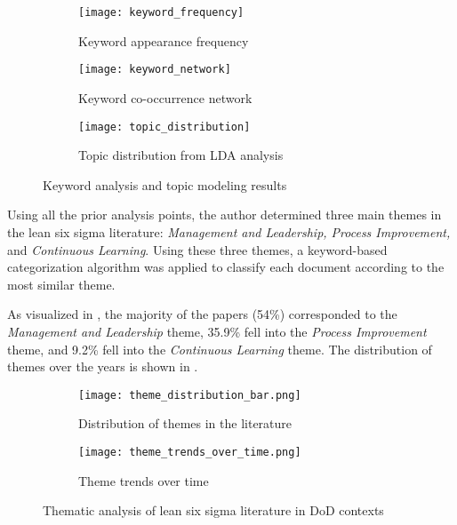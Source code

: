 \documentclass{article}
\begin{document}
	\begin{figure}[htbp]
		\centering
		\begin{subfigure}[b]{0.32\textwidth}
			\centering
			\texttt{[image: keyword\_frequency]}
			\caption{Keyword appearance frequency}
			\label{fig:keyword_freq}
		\end{subfigure}
		\hfill
		\begin{subfigure}[b]{0.32\textwidth}
			\centering
			\texttt{[image: keyword\_network]}
			\caption{Keyword co-occurrence network}
			\label{fig:keyword_network}
		\end{subfigure}
		\hfill
		\begin{subfigure}[b]{0.32\textwidth}
			\centering
			\texttt{[image: topic\_distribution]}
			\caption{Topic distribution from LDA analysis}
			\label{fig:topics}
		\end{subfigure}
		\caption{Keyword analysis and topic modeling results}
		\label{fig:keyword_analysis}
	\end{figure}

	Using all the prior analysis points, the author determined three main themes in the lean six sigma literature: \textit{Management and Leadership, Process Improvement,} and \textit{Continuous Learning}. 
	Using these three themes, a keyword-based categorization algorithm was applied to classify each document according to the most similar theme.

	As visualized in , the majority of the papers (54\%) corresponded to the \textit{Management and Leadership} theme, 35.9\% fell into the \textit{Process Improvement} theme, and 9.2\% fell into the \textit{Continuous Learning} theme.
	The distribution of themes over the years is shown in .


	\begin{figure}[htbp]
		\centering
		\begin{subfigure}[b]{0.48\textwidth}
			\centering
			\texttt{[image: theme\_distribution\_bar.png]}
			\caption{Distribution of themes in the literature}
			\label{fig:theme_distribution_bar}
		\end{subfigure}
		\hfill
		\begin{subfigure}[b]{0.48\textwidth}
			\centering
			\texttt{[image: theme\_trends\_over\_time.png]}
			\caption{Theme trends over time}
			\label{fig:theme_trends}
		\end{subfigure}
		\caption{Thematic analysis of lean six sigma literature in DoD contexts}
		\label{fig:theme_analysis}
	\end{figure}
\end{document}
